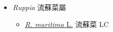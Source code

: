 
  \begin{itemize}
 \item[] \textit{Ruppia} 流蘇菜屬
                    
  \begin{itemize}
        \item[] \href{http://www.theplantlist.org/tpl1.1/search?q=Ruppia+maritima}{\textit{R. maritima} L.}   流蘇菜 LC
  \end{itemize}
  \end{itemize}
